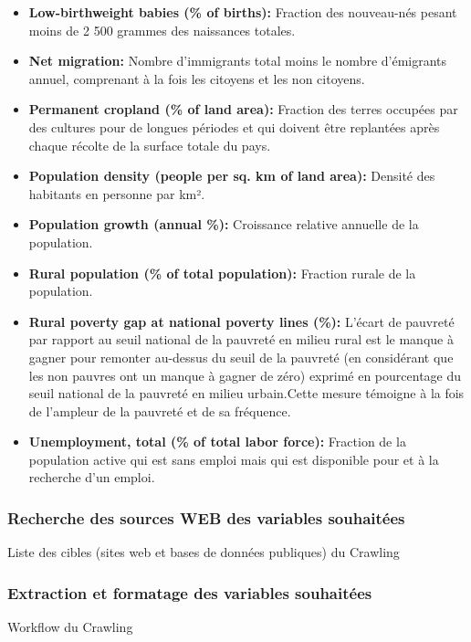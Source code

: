 \begin{itemize}
		\item \textbf{ Low-birthweight babies (\% of births):} Fraction des nouveau-nés pesant moins de 2 500 grammes des naissances totales.
		\item \textbf{ Net migration:} Nombre d'immigrants total moins le nombre d'émigrants annuel, comprenant à la fois les citoyens et les non citoyens.
		\item \textbf{ Permanent cropland (\% of land area):} Fraction des terres occupées par des cultures pour de longues périodes et qui doivent être replantées après chaque récolte de la surface totale du pays.
		\item \textbf{ Population density (people per sq. km of land area):} Densité des habitants en personne par km².
		\item \textbf{ Population growth (annual \%):} Croissance relative annuelle de la population.
		\item \textbf{ Rural population (\% of total population):} Fraction rurale de la population.
		\item \textbf{ Rural poverty gap at national poverty lines (\%):} L'écart de pauvreté par rapport au seuil national de la pauvreté en milieu rural est le manque à gagner pour remonter au-dessus du seuil de la pauvreté (en considérant que les non pauvres ont un manque à gagner de zéro) exprimé en pourcentage du seuil national de la pauvreté en milieu urbain.Cette mesure témoigne à la fois de l'ampleur de la pauvreté et de sa fréquence.
		\item \textbf{ Unemployment, total (\% of total labor force):} Fraction de la population active qui est sans emploi mais qui est disponible pour et à la recherche d'un emploi.
		\end{itemize}
	\subsubsection{Recherche des sources WEB des variables souhaitées}
	\par
	\begin{Huge}{ Liste des cibles (sites web et bases de données publiques) du Crawling }
		\end{Huge}
	\subsubsection{Extraction et formatage des variables souhaitées}\label{crawl}
	\par
	 \begin{Huge}{ Workflow du  Crawling }
	 		\end{Huge}
	
